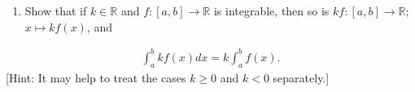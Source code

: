 \documentclass[letterpaper,10pt,english]{jupyterBook}
\begin{document}
\label{\detokenize{Problems:id71}}\begin{enumerate}
%
\setcounter{enumi}{70}
\item {} 
\sphinxAtStartPar
Show that if \(k\in\mathbb{R}\) and \(f:[a,b]\to\mathbb{R}\) is integrable, then so is \(kf:[a,b]\to\mathbb{R}\); \(x\mapsto kf(x)\), and

\end{enumerate}
\begin{equation*}
\begin{split}
\int_a^b kf(x)dx = k\int_a^bf(x).
\end{split}
\end{equation*}
\sphinxAtStartPar
{[}Hint: It may help to treat the cases \(k\geq 0\) and \(k<0\) separately.{]}
\end{document}
